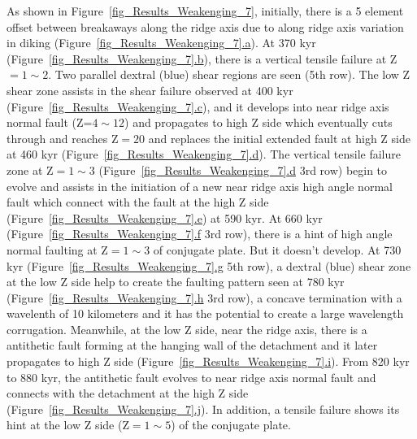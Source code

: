 As shown in Figure~\hyperref[fig_Results_Weakenging_7]{\ref{fig_Results_Weakenging_7}}, initially, there is a 5 element offset between breakaways along the ridge axis due to along ridge axis variation in diking (Figure~\hyperref[fig_Results_Weakenging_7]{\ref{fig_Results_Weakenging_7}.a}). At 370 kyr (Figure~\hyperref[fig_Results_Weakenging_7]{\ref{fig_Results_Weakenging_7}.b}), there is a vertical tensile failure at Z$=1\sim2$. Two parallel dextral (blue) shear regions are seen (5th row). The low Z shear zone assists in the shear failure observed at 400 kyr (Figure~\hyperref[fig_Results_Weakenging_7]{\ref{fig_Results_Weakenging_7}.c}), and it develops into near ridge axis normal fault (Z=$4\sim12$) and propagates to high Z side which eventually cuts through and reaches Z$=20$ and replaces the initial extended fault at high Z side at 460 kyr (Figure~\hyperref[fig_Results_Weakenging_7]{\ref{fig_Results_Weakenging_7}.d}). The vertical tensile failure zone at Z$=1\sim3$ (Figure~\hyperref[fig_Results_Weakenging_7]{\ref{fig_Results_Weakenging_7}.d} 3rd row) begin to evolve and assists in the initiation of a new near ridge axis high angle normal fault which connect with the fault at the high Z side (Figure~\hyperref[fig_Results_Weakenging_7]{\ref{fig_Results_Weakenging_7}.e}) at 590 kyr. At 660 kyr (Figure~\hyperref[fig_Results_Weakenging_7]{\ref{fig_Results_Weakenging_7}.f} 3rd row), there is a hint of high angle normal faulting at Z$=1\sim3$ of conjugate plate. But it doesn't develop. At 730 kyr (Figure~\hyperref[fig_Results_Weakenging_7]{\ref{fig_Results_Weakenging_7}.g} 5th row), a dextral (blue) shear zone at the low Z side help to create the faulting pattern seen at 780 kyr (Figure~\hyperref[fig_Results_Weakenging_7]{\ref{fig_Results_Weakenging_7}.h} 3rd row), a concave termination with a wavelenth of 10 kilometers and it has the potential to create a large wavelength corrugation. Meanwhile, at the low Z side, near the ridge axis, there is a antithetic fault forming at the hanging wall of the detachment and it later propagates to high Z side (Figure~\hyperref[fig_Results_Weakenging_7]{\ref{fig_Results_Weakenging_7}.i}). From 820 kyr to 880 kyr, the antithetic fault evolves to near ridge axis normal fault and connects with the detachment at the high Z side (Figure~\hyperref[fig_Results_Weakenging_7]{\ref{fig_Results_Weakenging_7}.j}). In addition, a tensile failure shows its hint at the low Z side (Z$=1\sim5$) of the conjugate plate.         

